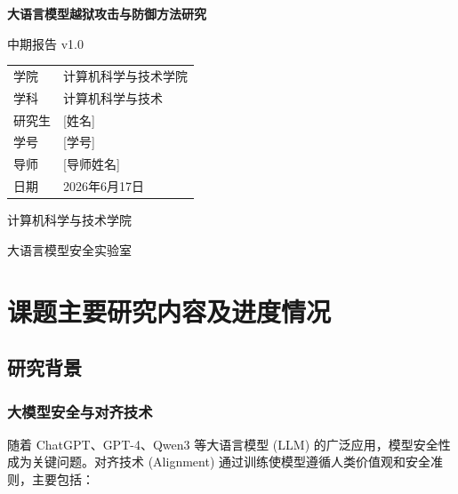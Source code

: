 \documentclass[12pt,a4paper]{article}
\begin{document}
\begin{titlepage}
    \centering
    \vspace*{2cm}
    
    {\Huge\bfseries\color{darkblue} 大语言模型越狱攻击与防御方法研究\par}
    \vspace{1cm}
    {\Large\color{primaryblue} 中期报告 v1.0\par}
    \vspace{3cm}
    
    \begin{tabular}{l@{\quad:\quad}l}
        学院 & 计算机科学与技术学院 \\
        学科 & 计算机科学与技术 \\
        研究生 & [姓名] \\
        学号 & [学号] \\
        导师 & [导师姓名] \\
        日期 & 2026年6月17日
    \end{tabular}
    
    \vfill
    {\large\color{gray} 计算机科学与技术学院\par}
    {\large\color{gray} 大语言模型安全实验室\par}
\end{titlepage}

\tableofcontents
\newpage

\section{课题主要研究内容及进度情况}

\subsection{研究背景}

\subsubsection{大模型安全与对齐技术}

随着 ChatGPT、GPT-4、Qwen3 等大语言模型 (LLM) 的广泛应用，模型安全性成为关键问题。对齐技术 (Alignment) 通过训练使模型遵循人类价值观和安全准则，主要包括：
\end{document}
